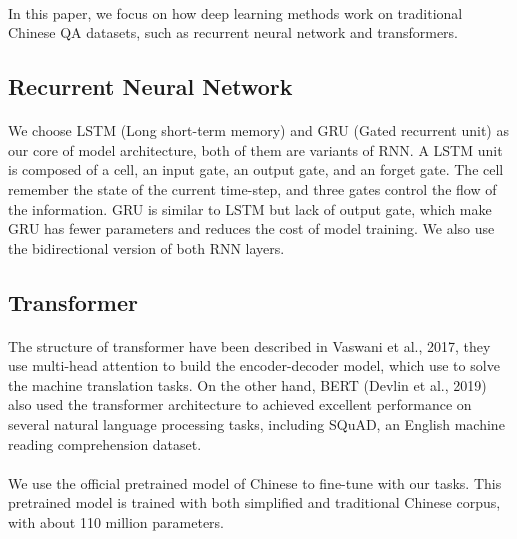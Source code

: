 \documentclass{article}
\begin{document}
\paragraph{}
In this paper, we focus on how deep learning methods work on traditional Chinese QA datasets, such as recurrent neural network and transformers.

\subsection{Recurrent Neural Network}
\paragraph{}
We choose LSTM\cite{hochreiter1997lstm} (Long short-term memory) and GRU\cite{cho2014learning} (Gated recurrent unit) as our core of model architecture, both of them are variants of RNN. A LSTM unit is composed of a cell, an input gate, an output gate, and an forget gate. The cell remember the state of the current time-step, and three gates control the flow of the information. GRU is similar to LSTM but lack of output gate, which make GRU has fewer parameters and reduces the cost of model training. We also use the bidirectional version of both RNN layers.

\subsection{Transformer}
\paragraph{}
The structure of transformer\cite{vaswani2017attention} have been described in Vaswani et al., 2017, they use multi-head attention to build the encoder-decoder model, which use to solve the machine translation tasks. On the other hand, BERT\cite{devlin2018bert} (Devlin et al., 2019) also used the transformer architecture to achieved excellent performance on several natural language processing tasks, including SQuAD, an English machine reading comprehension dataset.

\paragraph{}
We use the official pretrained model of Chinese to fine-tune with our tasks. This pretrained model is trained with both simplified and traditional Chinese corpus, with about 110 million parameters.
\end{document}
